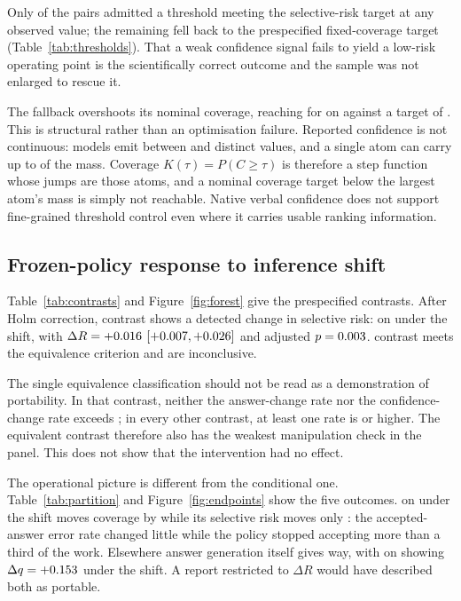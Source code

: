 \documentclass[information,article,submit,moreauthors]{Definitions/mdpi}
\begin{document}
Only \NumRiskTargetAttained{} of the \NumQualityPairs{} pairs admitted a threshold meeting
the \TargetRisk{} selective-risk target at any observed value; the remaining
\NumRiskTargetInfeasible{} fell back to the prespecified fixed-coverage target
(Table~\ref{tab:thresholds}). That a weak confidence signal fails to yield a
low-risk operating point is the scientifically correct outcome and the sample
was not enlarged to rescue it.

The fallback overshoots its nominal coverage, reaching \OvershootCoverage{} for
\OvershootModel{} on \OvershootDataset{} against a target of
\FixedCoverageTarget{}. This is structural rather than an optimisation failure.
Reported confidence is not continuous: models emit between
\MinDistinctConfidence{} and \MaxDistinctConfidence{} distinct values, and a
single atom can carry up to \MaxAtomMass{} of the mass. Coverage
$K(\tau)=P(C\ge\tau)$ is therefore a step function whose jumps are those atoms,
and a nominal coverage target below the largest atom's mass is simply not
reachable. Native verbal confidence does not support fine-grained threshold
control even where it carries usable ranking information.



\subsection{Frozen-policy response to inference shift}
\label{sec:shift}

Table~\ref{tab:contrasts} and Figure~\ref{fig:forest} give the
\NumContrasts{} prespecified contrasts. After Holm correction,
\NumChangeDetected{} contrast shows a detected change in selective risk:
\DetectedModel{} on \DetectedDataset{} under the \DetectedShift{} shift, with
$\Delta R = +0.016$ $[+0.007, +0.026]$ and adjusted
$p = 0.003$. \NumEquivalent{} contrast meets the equivalence criterion
and \NumInconclusive{} are inconclusive.

The single equivalence classification should not be read as a demonstration of
portability. In that contrast, neither the answer-change rate nor the
confidence-change rate exceeds \MaxRealisationEquivalent{}; in every other
contrast, at least one rate is \MinRealisationNonEquivalent{} or higher. The
equivalent contrast therefore also has the weakest manipulation check in the
panel. This does not show that the intervention had no effect.

The operational picture is different from the conditional one.
Table~\ref{tab:partition} and Figure~\ref{fig:endpoints} show the five outcomes.
\MaxCoverageModel{} on \MaxCoverageDataset{} under the \MaxCoverageShift{} shift
moves coverage by \MaxCoverageDeltaK{} while its selective risk moves only
\MaxCoverageDeltaR{}: the accepted-answer error rate changed little while the
policy stopped accepting more than a third of the work. Elsewhere answer
generation itself gives way, with \MaxAnswerFailModel{} on \MaxAnswerFailDataset{} showing
$\Delta q = +0.153{}$ under the \MaxAnswerFailShift{} shift. A
report restricted to $\Delta R$ would have described both as portable.
\end{document}
